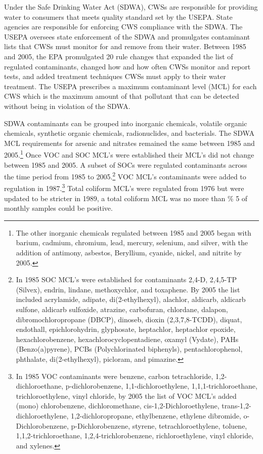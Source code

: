 \documentclass{article}
\begin{document}
Under the Safe Drinking Water Act (SDWA), CWSs are responsible for providing water to consumers that meets quality standard set by the USEPA. State agencies are responsible for enforcing CWS compliance with the SDWA. The USEPA oversees state enforcement of the SDWA and promulgates contaminant lists that CWSs must monitor for and remove from their water. Between 1985 and 2005, the EPA promulgated 20 rule changes that expanded the list of regulated contaminants, changed how and how often CWSs monitor and report tests, and added treatment techniques CWSs must apply to their water treatment. The USEPA prescribes a maximum contaminant level (MCL) for each CWS which is the maximum amount of that pollutant that can be detected without being in violation of the SDWA. 

SDWA contaminants can be grouped into inorganic chemicals, volatile organic chemicals, synthetic organic chemicals, radionuclides, and bacterials. The SDWA MCL requirements for arsenic and nitrates remained the same between 1985 and 2005.\footnote{The other inorganic chemicals regulated between 1985 and 2005 began with barium, cadmium, chromium, lead, mercury, selenium, and silver, with the addition of antimony, asbestos, Beryllium, cyanide, nickel, and nitrite by 2005.} Once VOC and SOC MCL's were established their MCL's did not change between 1985 and 2005. A subset of SOCs were regulated contaminants across the time period from 1985 to 2005.\footnote{In 1985 SOC MCL's were established for contaminants 2,4-D, 2,4,5-TP (Silvex), endrin, lindane, methoxychlor, and toxaphene. By 2005 the list included acrylamide, adipate, di(2-ethylhexyl), alachlor, aldicarb, aldicarb sulfone, aldicarb sulfoxide, atrazine, carbofuran, chlordane, dalapon, dibromochloropropane (DBCP), dinoseb, dioxin (2,3,7,8-TCDD), diquat, endothall, epichlorohydrin, glyphosate, heptachlor, heptachlor epoxide, hexachlorobenzene, hexachlorocyclopentadiene, oxamyl (Vydate), PAHs (Benzo(a)pyrene), PCBs (Polychlorinated biphenyls), pentachlorophenol, phthalate, di(2-ethylhexyl), picloram, and pimazine.} VOC MCL's contaminants were added to regulation in 1987.\footnote{In 1985 VOC contaminants were benzene, carbon tetrachloride, 1,2-dichloroethane, p-dichlorobenzene, 1,1-dichloroethylene, 1,1,1-trichloroethane, trichloroethylene, vinyl chloride, by 2005 the list of VOC MCL's added (mono) chlorobenzene, dichloromethane, cis-1,2-Dichloroethylene, trans-1,2-dichloroethylene, 1,2-dichloropropane, ethylbenzene, ethylene dibromide, o-Dichlorobenzene, p-Dichlorobenzene, styrene, tetrachloroethylene, toluene, 1,1,2-trichloroethane, 1,2,4-trichlorobenzene, richloroethylene, vinyl chloride, and xylenes.} Total coliform MCL's were regulated from 1976 but were updated to be stricter in 1989, a total coliform MCL was no more than \% 5 of monthly samples could be positive.
\end{document}
